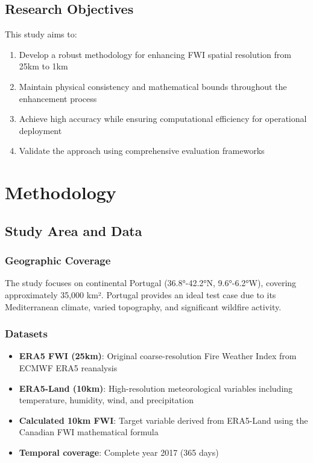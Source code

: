 \documentclass[11pt,a4paper]{article}
\begin{document}
\subsection{Research Objectives}
This study aims to:
\begin{enumerate}
    \item Develop a robust methodology for enhancing FWI spatial resolution from 25km to 1km
    \item Maintain physical consistency and mathematical bounds throughout the enhancement process
    \item Achieve high accuracy while ensuring computational efficiency for operational deployment
    \item Validate the approach using comprehensive evaluation frameworks
\end{enumerate}

\section{Methodology}

\subsection{Study Area and Data}
\subsubsection{Geographic Coverage}
The study focuses on continental Portugal (36.8°-42.2°N, 9.6°-6.2°W), covering approximately 35,000 km². Portugal provides an ideal test case due to its Mediterranean climate, varied topography, and significant wildfire activity.

\subsubsection{Datasets}
\begin{itemize}
    \item \textbf{ERA5 FWI (25km)}: Original coarse-resolution Fire Weather Index from ECMWF ERA5 reanalysis
    \item \textbf{ERA5-Land (10km)}: High-resolution meteorological variables including temperature, humidity, wind, and precipitation
    \item \textbf{Calculated 10km FWI}: Target variable derived from ERA5-Land using the Canadian FWI mathematical formula
    \item \textbf{Temporal coverage}: Complete year 2017 (365 days)
\end{itemize}
\end{document}
